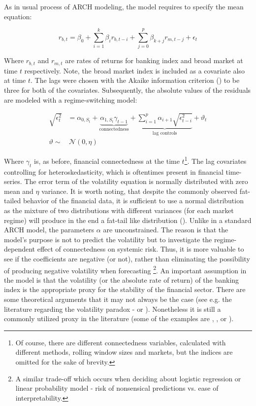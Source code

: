 \documentclass[12pt]{article}
\begin{document}
As in usual process of ARCH modeling, the model requires to specify the mean equation:

\begin{equation}
	r_{b,t} = \beta_0 + \sum_{i=1}^{k}\beta_i r_{b, t-i} + \sum_{j=0}^{p}\beta_{k+j} r_{m, t-j} + \epsilon_t	
\end{equation}

Where $r_{b,t}$ and $r_{m, t}$ are rates of returns for banking index and broad market at time $t$ respectively. Note, the broad market index is included as a covariate also at time $t$. The lags were chosen with the Akaike information criterion (\citet{akaike98}) to be three for both of the covariates. Subsequently, the absolute values of the residuals are modeled with a regime-switching model:


\begin{align}
	\label{equation:vol_model}
\sqrt{\epsilon^{2}_t} &= \alpha_{0,S_t} + \underbrace{\alpha_{1,S_t} \gamma_{t-1}}_{\text{connectedness}} + \underbrace{\sum_{i=1}^{p} \alpha_{i+1} \sqrt{\epsilon^2_{t-i}}}_{\text{lag controls}} + \vartheta_t \\
\vartheta \sim & \, \mathcal{N}(0, \eta)
\end{align}

Where $\gamma_t$ is, as before, financial connectedness at the time $t$\footnote{Of course, there are different connectedness variables, calculated with different methods, rolling window sizes and markets, but the indices are omitted for the sake of brevity.}. The lag covariates controlling for heteroskedasticity, which is oftentimes present in financial time-series. The error term of the volatility equation is normally distributed with zero mean and $\eta$ variance. It is worth noting, that despite the commonly observed fat-tailed behavior of the financial data, it is sufficient to use a normal distribution as the mixture of two distributions with different variances (for each market regime) will produce in the end a fat-tail like distribution (\citet{timmermann00}). Unlike in a standard ARCH model, the parameters $\alpha$ are unconstrained. The reason is that the model's purpose is not to predict the volatility but to investigate the regime-dependent effect of connectedness on systemic risk. Thus, it is more valuable to see if the coefficients are negative (or not), rather than eliminating the possibility of producing negative volatility when forecasting \footnote{A similar trade-off which occurs when deciding about logistic regression or linear probability model - risk of nonsensical predictions vs. ease of interpretability.}. An important assumption in the model is that the volatility (or the absolute rate of return) of the banking index is the appropriate proxy for the stability of the financial sector. There are some theoretical arguments that it may not always be the case (see e.g. the literature regarding the volatility paradox - \citet{brunnermeier14} or \citet{danielsson18}). Nonetheless it is still a commonly utilized proxy in the literature (some of the examples are \citet{nelson07}, \citet{bratis20}, \citet{imf08} or \citet{billio16}).
\end{document}
